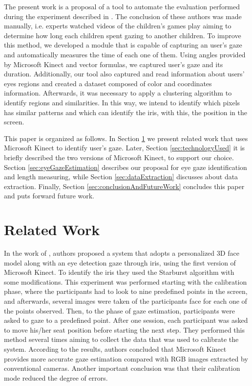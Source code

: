 \documentclass[10pt, conference]{IEEEtran}
\begin{document}
	The present work is a proposal of a tool to automate the evaluation performed during the experiment described in \cite{6}.   
	The conclusion of these authors was made manually, i.e. experts watched videos of the children's games play aiming to determine how long each children spent gazing to another children.
	To improve this method, we developed a module that is capable of capturing an user's gaze and automatically measures the time of each one of them.
	Using angles provided by Microsoft Kinect and vector formulas, we captured user's gaze and its duration.
	Additionally, our tool also captured and read information about users' eyes regions and created a dataset composed of color and coordinates information.
	Afterwards, it was necessary to apply a clustering algorithm to identify regions and similarities. In this way, we intend to identify which pixels has similar patterns and which can identify the iris, with this, the position in the screen.
    
	This paper is organized as follows.
	In Section \ref{sec:relatedWork} we present related work that uses Microsoft Kinect to identify user's gaze.
	Later, Section \ref{sec:technologyUsed} it is briefly described the two versions of Microsoft Kinect, to support our choice.
	Section \ref{sec:eyeGazeEstimation} describes our proposal for eye gaze identification and length measuring, while Section \ref{sec:dataExtraction} discusses about data extraction.
	Finally, Section \ref{sec:conclusionAndFutureWork} concludes this paper and puts forward future work.

\section{Related Work} \label{sec:relatedWork}

	In the work of \cite{7}, authors proposed a system that adopts a personalized 3D face model along with an eye detection gaze through iris, using the first version of Microsoft Kinect. 
	To identify the iris they used the Starburst algorithm \cite{8} with some modifications. 
	This experiment was performed starting with the calibration phase, where the participants had to look to nine predefined points in the screen, and afterwards, several images were taken of the participants face for each one of the points observed. 
	Then, to the phase of gaze estimation, participants were asked to gaze to a predefined point. 
	After one session, each participant was asked to move his/her seat position before starting the next step. 
	They performed this method several times aiming to collect the data that was used to calibrate the system.
	According to the results, authors concluded that Microsoft Kinect provides more accurate gaze estimation compared with RGB images extracted by conventional cameras. Another important conclusion was that their calibration mode reduced the degree of errors.
\end{document}
